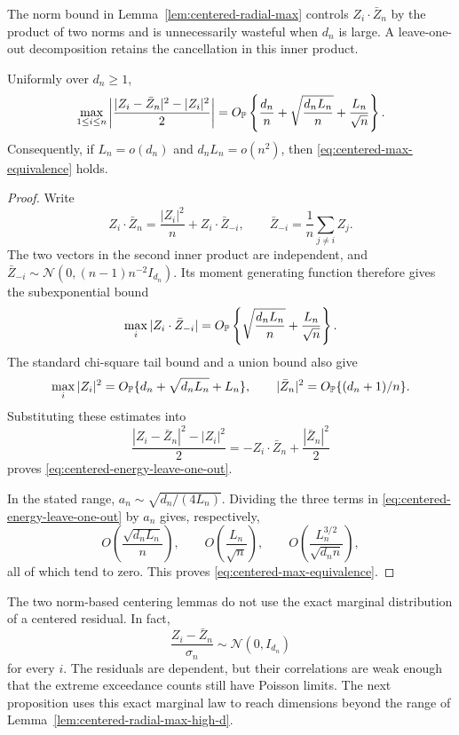 The norm bound in Lemma~\ref{lem:centered-radial-max} controls
\(Z_i\cdot\bar Z_n\) by the product of two norms and is unnecessarily
wasteful when \(d_n\) is large. A
leave-one-out decomposition retains the cancellation in this inner product.

\begin{lemma}
\label{lem:centered-radial-max-high-d}
Uniformly over \(d_n\ge1\),
\begin{equation}
\label{eq:centered-energy-leave-one-out}
 \max_{1\le i\le n}
 \left|
  \frac{|Z_i-\bar Z_n|^2-|Z_i|^2}{2}
 \right|
 =
 O_{\mathbb P}\left\{
  \frac{d_n}{n}
  +\sqrt{\frac{d_nL_n}{n}}
  +\frac{L_n}{\sqrt n}
 \right\}.
\end{equation}
Consequently, if \(L_n=o(d_n)\) and \(d_nL_n=o(n^2)\), then
\eqref{eq:centered-max-equivalence} holds.
\end{lemma}

\begin{proof}
Write
\[
 Z_i\cdot\bar Z_n
 =
 \frac{|Z_i|^2}{n}
 +Z_i\cdot\bar Z_{-i},
 \qquad
 \bar Z_{-i}=\frac1n\sum_{j\ne i}Z_j.
\]
The two vectors in the second inner product are independent, and
\(\bar Z_{-i}\sim\mathcal N(0,(n-1)n^{-2}I_{d_n})\).  Its moment generating
function therefore gives the subexponential bound
\[
 \max_i|Z_i\cdot\bar Z_{-i}|
 =
 O_{\mathbb P}\left\{
  \sqrt{\frac{d_nL_n}{n}}+\frac{L_n}{\sqrt n}
 \right\}.
\]
The standard chi-square tail bound and a union bound also give
\[
 \max_i|Z_i|^2
 =
 O_{\mathbb P}\{d_n+\sqrt{d_nL_n}+L_n\},
 \qquad
 |\bar Z_n|^2=O_{\mathbb P}\{(d_n+1)/n\}.
\]
Substituting these estimates into
\[
 \frac{|Z_i-\bar Z_n|^2-|Z_i|^2}{2}
 =-Z_i\cdot\bar Z_n+\frac{|\bar Z_n|^2}{2}
\]
proves \eqref{eq:centered-energy-leave-one-out}.

In the stated range,
\(a_n\sim\sqrt{d_n/(4L_n)}\).  Dividing the three terms in
\eqref{eq:centered-energy-leave-one-out} by \(a_n\) gives, respectively,
\[
 O\left(\frac{\sqrt{d_nL_n}}n\right),\qquad
 O\left(\frac{L_n}{\sqrt n}\right),\qquad
 O\left(\frac{L_n^{3/2}}{\sqrt{d_nn}}\right),
\]
all of which tend to zero.  This proves
\eqref{eq:centered-max-equivalence}.
\end{proof}

The two norm-based centering lemmas do not use the exact marginal
distribution of a centered residual. In fact,
\[
 \frac{Z_i-\bar Z_n}{\sigma_n}\sim\mathcal N(0,I_{d_n})
\]
for every \(i\).  The residuals are dependent, but their correlations are
weak enough that the extreme exceedance counts still have Poisson limits.
The next proposition uses this exact marginal law to reach dimensions beyond
the range of Lemma~\ref{lem:centered-radial-max-high-d}.

